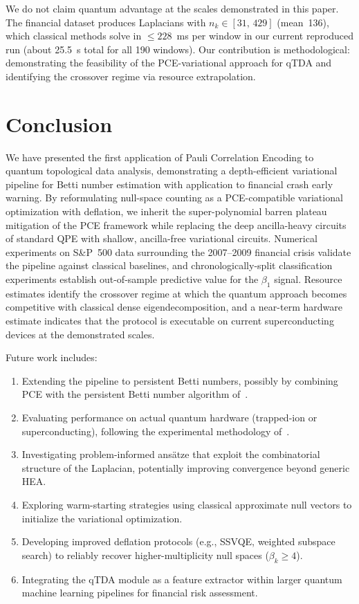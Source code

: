 \documentclass[conference,10pt]{IEEEtran}
\begin{document}
We do not claim quantum advantage at the scales demonstrated in this
paper. The financial dataset produces Laplacians with
$n_k \in [31,\,429]$ (mean~136), which classical methods solve in
$\leq 228$~ms per window in our current reproduced run (about 25.5~s total
for all 190 windows). Our contribution is methodological:
demonstrating the feasibility of the PCE-variational approach for
qTDA and identifying the crossover regime via resource extrapolation.

\section{Conclusion}\label{sec:conclusion}

We have presented the first application of Pauli Correlation Encoding
to quantum topological data analysis, demonstrating a depth-efficient
variational pipeline for Betti number estimation with application to
financial crash early warning. By reformulating null-space counting as
a PCE-compatible variational optimization with deflation, we inherit
the super-polynomial barren plateau mitigation of the PCE framework
while replacing the deep ancilla-heavy circuits of standard QPE with
shallow, ancilla-free variational circuits. Numerical experiments on
S\&P~500 data surrounding the 2007--2009 financial crisis validate
the pipeline against classical baselines, and chronologically-split
classification experiments establish out-of-sample predictive value
for the $\beta_1$ signal. Resource estimates identify the crossover
regime at which the quantum approach becomes competitive with
classical dense eigendecomposition, and a near-term hardware
estimate indicates that the protocol is executable on current
superconducting devices at the demonstrated scales.

Future work includes:
\begin{enumerate}
    \item Extending the pipeline to persistent Betti numbers, possibly
    by combining PCE with the persistent Betti number algorithm
    of~\cite{Hayakawa22}.
    \item Evaluating performance on actual quantum hardware
    (trapped-ion or superconducting), following the experimental
    methodology of~\cite{Sciorilli24, PCElabs25}.
    \item Investigating problem-informed ans\"atze that exploit the
    combinatorial structure of the Laplacian, potentially improving
    convergence beyond generic HEA.
    \item Exploring warm-starting strategies using classical
    approximate null vectors to initialize the variational
    optimization.
    \item Developing improved deflation protocols (e.g., SSVQE,
    weighted subspace search) to reliably recover higher-multiplicity
    null spaces ($\beta_k \geq 4$).
    \item Integrating the qTDA module as a feature extractor within
    larger quantum machine learning pipelines for financial risk
    assessment.
\end{enumerate}
\end{document}
